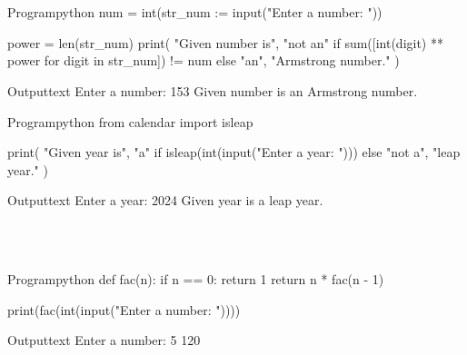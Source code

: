 \documentclass[11pt]{ipu-python}
\begin{document}
    \\~\\
    \begin{code}
        {Program}{python}
num = int(str_num := input("Enter a number: "))

power = len(str_num)
print(
    "Given number is",
    "not an" if sum([int(digit) ** power for digit in str_num]) != num else "an",
    "Armstrong number."
)
    \end{code}
    \begin{code}
        {Output}{text}
Enter a number: 153
Given number is an Armstrong number.
    \end{code}

    \newpage
    \begin{code}
        {Program}{python}
from calendar import isleap

print(
    "Given year is",
    "a" if isleap(int(input("Enter a year: "))) else "not a",
    "leap year."
)
    \end{code}
    \begin{code}
        {Output}{text}
Enter a year: 2024
Given year is a leap year.
    \end{code}

    \\~\\
    \begin{code}
        {Program}{python}
def fac(n):
    if n == 0:
        return 1
    return n * fac(n - 1)


print(fac(int(input("Enter a number: "))))
    \end{code}
    \begin{code}
        {Output}{text}
Enter a number: 5
120
    \end{code}
\end{document}
